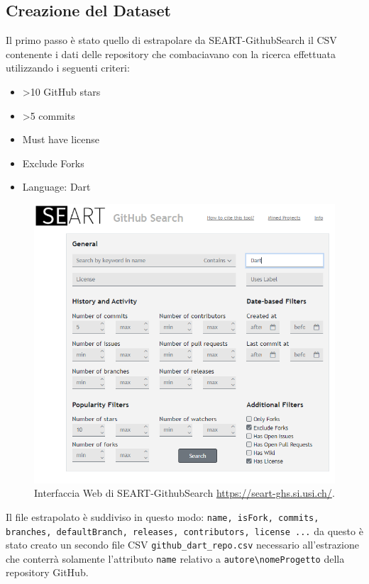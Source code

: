 \subsection{Creazione del Dataset}
Il primo passo è stato quello di estrapolare da SEART-GithubSearch il CSV contenente i dati delle repository che combaciavano con la ricerca effettuata utilizzando i seguenti criteri:
\begin{itemize}
    \item >10 GitHub stars
    \item >5 commits
    \item Must have license
    \item Exclude Forks
    \item Language: Dart
\end{itemize}

\begin{figure}[htbp]
\centerline{\includegraphics[scale=.85]{immagini/SEARTGithubSearch.png}}
\caption{Interfaccia Web di SEART-GithubSearch \url{https://seart-ghs.si.usi.ch/}\cite{Dabic:msr2021data}.}
\label{fig}
\end{figure}

Il file estrapolato è suddiviso in questo modo:
\texttt{name, isFork, commits, branches, defaultBranch, releases, contributors, license ...}
da questo è stato creato un secondo file CSV \texttt{github\_dart\_repo.csv} necessario all'estrazione che conterrà solamente l'attributo \texttt{name} relativo a \texttt{autore\textbackslash nomeProgetto} della repository GitHub.

